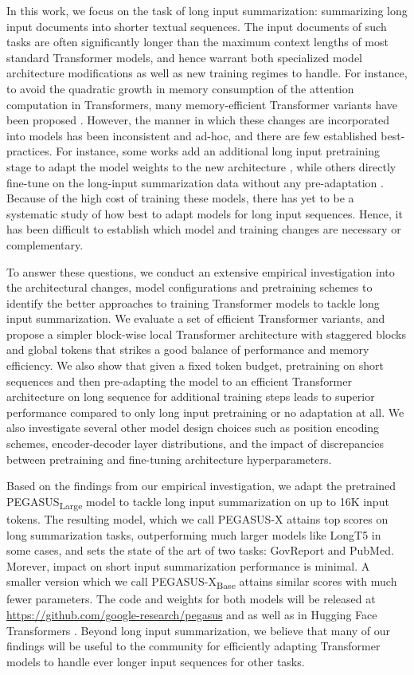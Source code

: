 \documentclass[11pt]{article}
\newcommand{\largemodel}{PEGASUS-X}
\newcommand{\smallmodel}{{PEGASUS-X\textsubscript{Base}}}
\begin{document}
In this work, we focus on the task of long input summarization: summarizing long input documents into shorter textual sequences.
The input documents of such tasks are often significantly longer than the maximum context lengths of most standard Transformer models, and hence warrant both specialized model architecture modifications as well as new training regimes to handle.
For instance, to avoid the quadratic growth in memory consumption of the attention computation in Transformers, many memory-efficient Transformer variants have been proposed \citep{tay2020efficient,tay2021long}.
However, the manner in which these changes are incorporated into models has been inconsistent and ad-hoc, and there are few established best-practices.
For instance, some works add an additional long input pretraining stage to adapt the model weights to the new architecture \citep{beltagy2020longformer}, while others directly fine-tune on the long-input summarization data without any pre-adaptation \citep{zaheer2020bigbird, pang2022topdown}.
Because of the high cost of training these models, there has yet to be a systematic study of how best to adapt models for long input sequences.
Hence, it has been difficult to establish which model and training changes are necessary or complementary.

To answer these questions, we conduct an extensive empirical investigation into the architectural changes, model configurations and pretraining schemes to identify the better approaches to training Transformer models to tackle long input summarization.
We evaluate a set of efficient Transformer variants, and propose a simpler block-wise local Transformer architecture with staggered blocks and global tokens that strikes a good balance of performance and memory efficiency.
We also show that given a fixed token budget, pretraining on short sequences and then pre-adapting the model to an efficient Transformer architecture on long sequence for additional training steps leads to superior performance compared to only long input pretraining or no adaptation at all.
We also investigate several other model design choices such as position encoding schemes, encoder-decoder layer distributions, and the impact of discrepancies between pretraining and fine-tuning architecture hyperparameters.

Based on the findings from our empirical investigation, we adapt the pretrained PEGASUS\textsubscript{Large} model \citep{zhang2019pegasus} to tackle long input summarization on up to 16K input tokens. 
The resulting model, which we call \largemodel{} attains top scores on long summarization tasks, outperforming much larger models like LongT5 \citep{guo2021longt5} in some cases, and sets the state of the art of two tasks: GovReport and PubMed.
Morever, impact on short input summarization performance is minimal.
A smaller version which we call \smallmodel{} attains similar scores with much fewer parameters.
The code and weights for both models will be released at \url{https://github.com/google-research/pegasus} and as well as in Hugging Face Transformers \citep{wolf2020transformers}.
Beyond long input summarization, we believe that many of our findings will be useful to the community for efficiently adapting Transformer models to handle ever longer input sequences for other tasks.
\end{document}
